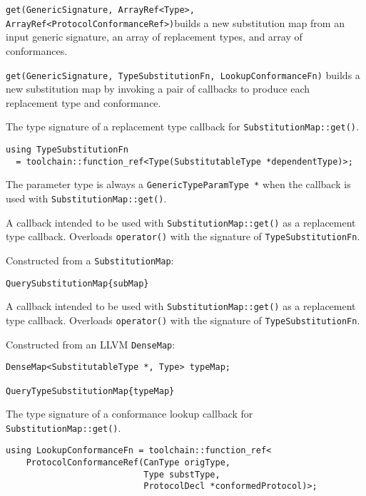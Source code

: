 \documentclass[../generics]{subfiles}
\begin{document}
\medskip
\noindent
\texttt{get(GenericSignature, ArrayRef<Type>, ArrayRef<ProtocolConformanceRef>)}\newline builds a new substitution map from an input generic signature, an array of replacement types, and array of conformances.

\medskip
\noindent
\texttt{get(GenericSignature, TypeSubstitutionFn, LookupConformanceFn)} builds a new substitution map by invoking a pair of callbacks to produce each replacement type and conformance.

The type signature of a replacement type callback for \texttt{SubstitutionMap::get()}.
\begin{verbatim}
using TypeSubstitutionFn
  = toolchain::function_ref<Type(SubstitutableType *dependentType)>;
\end{verbatim}
The parameter type is always a \texttt{GenericTypeParamType *} when the callback is used with \texttt{SubstitutionMap::get()}.

A callback intended to be used with \texttt{SubstitutionMap::get()} as a replacement type callback.
Overloads \texttt{operator()} with the signature of \texttt{TypeSubstitutionFn}.

Constructed from a \texttt{SubstitutionMap}:
\begin{Verbatim}
QuerySubstitutionMap{subMap}
\end{Verbatim}

A callback intended to be used with \texttt{SubstitutionMap::get()} as a replacement type callback.
Overloads \texttt{operator()} with the signature of \texttt{TypeSubstitutionFn}.

Constructed from an LLVM \texttt{DenseMap}:
\begin{Verbatim}
DenseMap<SubstitutableType *, Type> typeMap;

QueryTypeSubstitutionMap{typeMap}
\end{Verbatim}

The type signature of a conformance lookup callback for \texttt{SubstitutionMap::get()}.
\begin{verbatim}
using LookupConformanceFn = toolchain::function_ref<
    ProtocolConformanceRef(CanType origType,
                           Type substType,
                           ProtocolDecl *conformedProtocol)>;
\end{verbatim}
\end{document}
